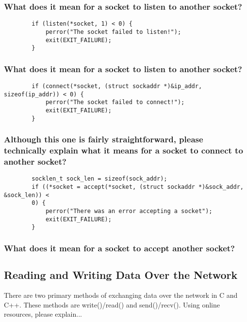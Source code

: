 \documentclass{article}
\begin{document}
	\subsubsection{What does it mean for a socket to listen to another socket?}
	\vspace{72pt}
	
	\begin{lstlisting}
		if (listen(*socket, 1) < 0) {
			perror("The socket failed to listen!");
			exit(EXIT_FAILURE);
		}
	\end{lstlisting}
	
	\subsubsection{What does it mean for a socket to listen to another socket?}
	\vspace{72pt}
	
	\begin{lstlisting}
		if (connect(*socket, (struct sockaddr *)&ip_addr, sizeof(ip_addr)) < 0) {
			perror("The socket failed to connect!");
			exit(EXIT_FAILURE);
		}
	\end{lstlisting}
	
	\subsubsection{Although this one is fairly straightforward, please technically explain what it means for a socket to connect to another socket?}
	\vspace{72pt}
	
	\begin{lstlisting}
		socklen_t sock_len = sizeof(sock_addr);
		if ((*socket = accept(*socket, (struct sockaddr *)&sock_addr, &sock_len)) <
		0) {
			perror("There was an error accepting a socket");
			exit(EXIT_FAILURE);
		}
	\end{lstlisting}
	
	\subsubsection{What does it mean for a socket to accept another socket?}
	\vspace{72pt}
	\pagebreak{}
	
	\begin{Large}
		\subsection{\textbf{Reading and Writing Data Over the Network}}
	\end{Large}
	There are two primary methods of exchanging data over the network in C and C++. These methods are write()/read() and send()/recv(). Using online resources, please explain...
	
\end{document}

